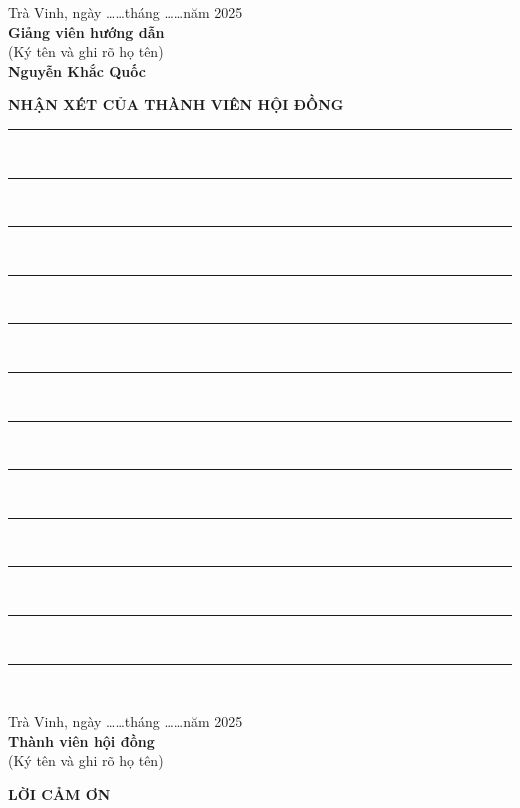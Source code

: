 \documentclass[a4paper,13pt]{extreport}
\begin{document}
\vspace{2cm}
\begin{flushright}
Trà Vinh, ngày \ldots\ldots tháng \ldots\ldots năm 2025\\[1cm]
\textbf{Giảng viên hướng dẫn}\\
(Ký tên và ghi rõ họ tên)\\[2cm]
\textbf{Nguyễn Khắc Quốc}
\end{flushright}

\newpage
\thispagestyle{empty}
\begin{center}
\textbf{\Large NHẬN XÉT CỦA THÀNH VIÊN HỘI ĐỒNG}
\end{center}
\vspace{1cm}
\noindent\rule{\linewidth}{0.4pt}\\[0.5cm]
\noindent\rule{\linewidth}{0.4pt}\\[0.5cm]
\noindent\rule{\linewidth}{0.4pt}\\[0.5cm]
\noindent\rule{\linewidth}{0.4pt}\\[0.5cm]
\noindent\rule{\linewidth}{0.4pt}\\[0.5cm]
\noindent\rule{\linewidth}{0.4pt}\\[0.5cm]
\noindent\rule{\linewidth}{0.4pt}\\[0.5cm]
\noindent\rule{\linewidth}{0.4pt}\\[0.5cm]
\noindent\rule{\linewidth}{0.4pt}\\[0.5cm]
\noindent\rule{\linewidth}{0.4pt}\\[0.5cm]
\noindent\rule{\linewidth}{0.4pt}\\[0.5cm]
\noindent\rule{\linewidth}{0.4pt}\\[0.5cm]

\vspace{2cm}
\begin{flushright}
Trà Vinh, ngày \ldots\ldots tháng \ldots\ldots năm 2025\\[1cm]
\textbf{Thành viên hội đồng}\\
(Ký tên và ghi rõ họ tên)\\[2cm]
\end{flushright}

\newpage
\thispagestyle{empty}
\begin{center}
\textbf{\Large LỜI CẢM ƠN}
\end{center}
\vspace{1cm}
\end{document}
